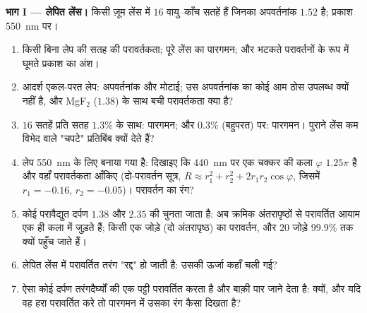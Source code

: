 \begin{problem}
\label{pb:b2:wave-interfaces:1}

\medskip
\noindent\textbf{भाग I --- लेपित लेंस।}
किसी ज़ूम लेंस में $16$ वायु--काँच सतहें हैं जिनका अपवर्तनांक $1.52$ है;
प्रकाश \qty{550}{nm} पर।
\begin{enumerate}
  \item किसी बिना लेप की सतह की परावर्तकता; पूरे लेंस का पारगमन;
        और भटकते परावर्तनों के रूप में घूमते प्रकाश का अंश।
  \item आदर्श एकल-परत लेप: अपवर्तनांक और मोटाई; उस अपवर्तनांक का
        कोई आम ठोस उपलब्ध क्यों नहीं है, और MgF$_2$ ($1.38$) के साथ
        बची परावर्तकता क्या है?
  \item $16$ सतहें प्रति सतह $1.3\%$ के साथ: पारगमन; और $0.3\%$
        (बहुपरत) पर: पारगमन। पुराने लेंस कम विभेद वाले "चपटे"
        प्रतिबिंब क्यों देते हैं?
  \item लेप \qty{550}{nm} के लिए बनाया गया है: दिखाइए कि
        \qty{440}{nm} पर एक चक्कर की कला $\varphi$ $1.25\pi$ है और
        वहाँ परावर्तकता आँकिए (दो-परावर्तन सूत्र, $R
        \approx r_1^2 + r_2^2 + 2r_1r_2\cos\varphi$, जिसमें $r_1 = -0.16$, $r_2 =
        -0.05$)। परावर्तन का रंग?
  \item कोई परावैद्युत दर्पण $1.38$ और $2.35$ की 
        चुनता जाता है: अब क्रमिक अंतरापृष्ठों से परावर्तित आयाम
        एक ही कला में जुड़ते हैं; किसी एक जोड़े (दो अंतरापृष्ठ) का
        परावर्तन, और $20$ जोड़े $99.9\%$ तक क्यों पहुँच जाते हैं।
  \item लेपित लेंस में परावर्तित तरंग "रद्द" हो जाती है: उसकी
        ऊर्जा कहाँ चली गई?
  \item ऐसा कोई दर्पण तरंगदैर्घ्यों की एक पट्टी परावर्तित करता है और
        बाक़ी पार जाने देता है: क्यों, और यदि वह हरा परावर्तित करे तो
        पारगमन में उसका रंग कैसा दिखता है?
\end{enumerate}


\end{problem}
